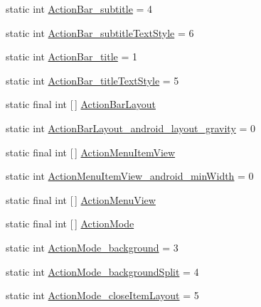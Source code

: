 \begin{DoxyCompactItemize}
\item 
static int \hyperlink{classandroid_1_1support_1_1design_1_1R_1_1styleable_a26cd68edf0c066a7b5fb1dbe28a37b3c}{Action\+Bar\+\_\+subtitle} = 4
\item 
static int \hyperlink{classandroid_1_1support_1_1design_1_1R_1_1styleable_a0773b4b5cb408a7cf70b187a6507fd8c}{Action\+Bar\+\_\+subtitle\+Text\+Style} = 6
\item 
static int \hyperlink{classandroid_1_1support_1_1design_1_1R_1_1styleable_a0b7043e37b09ed435f5845bbad61bcb5}{Action\+Bar\+\_\+title} = 1
\item 
static int \hyperlink{classandroid_1_1support_1_1design_1_1R_1_1styleable_ace9dbdf383d562ec34cff99140bde632}{Action\+Bar\+\_\+title\+Text\+Style} = 5
\item 
static final int \mbox{[}$\,$\mbox{]} \hyperlink{classandroid_1_1support_1_1design_1_1R_1_1styleable_a0836ebb5f737b4f92fdf54e3c8fee963}{Action\+Bar\+Layout}
\item 
static int \hyperlink{classandroid_1_1support_1_1design_1_1R_1_1styleable_ab46b09d66931dd9a9d75f86ffac54800}{Action\+Bar\+Layout\+\_\+android\+\_\+layout\+\_\+gravity} = 0
\item 
static final int \mbox{[}$\,$\mbox{]} \hyperlink{classandroid_1_1support_1_1design_1_1R_1_1styleable_a8012131c7219387ea0073f47dbd32125}{Action\+Menu\+Item\+View}
\item 
static int \hyperlink{classandroid_1_1support_1_1design_1_1R_1_1styleable_ae892e88d62f26ff9d5e53a8c339a9837}{Action\+Menu\+Item\+View\+\_\+android\+\_\+min\+Width} = 0
\item 
static final int \mbox{[}$\,$\mbox{]} \hyperlink{classandroid_1_1support_1_1design_1_1R_1_1styleable_a4d18219c3fcb3eb5fec8cdc13873f0bd}{Action\+Menu\+View}
\item 
static final int \mbox{[}$\,$\mbox{]} \hyperlink{classandroid_1_1support_1_1design_1_1R_1_1styleable_aece7cc3345738baf4a59955f870e1507}{Action\+Mode}
\item 
static int \hyperlink{classandroid_1_1support_1_1design_1_1R_1_1styleable_a81bc07a1276ce6af7fef73c2de25aec8}{Action\+Mode\+\_\+background} = 3
\item 
static int \hyperlink{classandroid_1_1support_1_1design_1_1R_1_1styleable_a22f0bded352156527e400e1037bcd318}{Action\+Mode\+\_\+background\+Split} = 4
\item 
static int \hyperlink{classandroid_1_1support_1_1design_1_1R_1_1styleable_a5323a23312ce2829985c0e29c45cb453}{Action\+Mode\+\_\+close\+Item\+Layout} = 5

\end{DoxyCompactItemize}
